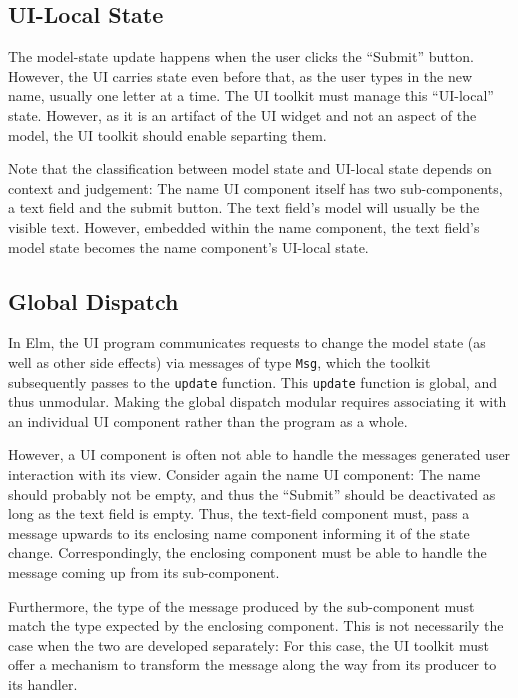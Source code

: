 \documentclass[sigplan,screen]{acmart}
\begin{document}
\subsection{UI-Local State}

The model-state update happens when the user clicks the ``Submit''
button.  However, the UI carries state even before that, as the user
types in the new name, usually one letter at a time.  The UI toolkit
must manage this ``UI-local'' state.  However, as it is an artifact of
the UI widget and not an aspect of the model, the UI toolkit should
enable separting them.

Note that the classification between model state and UI-local state
depends on context and judgement: The name UI component itself has two
sub-components, a text field and the submit button.  The text field's
model will usually be the visible text.  However, embedded within the
name component, the text field's model state becomes the name
component's UI-local state.

\subsection{Global Dispatch}

In Elm, the UI program communicates requests to change the model state
(as well as other side effects) via messages of type \texttt{Msg},
which the toolkit subsequently passes to the \texttt{update} function.
This \texttt{update} function is global, and thus unmodular.  Making
the global dispatch modular requires associating it with an individual
UI component rather than the program as a whole.

However, a UI component is often not able to handle the messages
generated user interaction with its view.  Consider again the name UI
component: The name should probably not be empty, and thus the
``Submit'' should be deactivated as long as the text field is empty.
Thus, the text-field component must, pass a message upwards to its
enclosing name component informing it of the state change.
Correspondingly, the enclosing component must be able to handle the
message coming up from its sub-component.

Furthermore, the type of the message produced by the sub-component
must match the type expected by the enclosing component.  This is not
necessarily the case when the two are developed separately: For this
case, the UI toolkit must offer a mechanism to transform the message
along the way from its producer to its handler.
\end{document}
